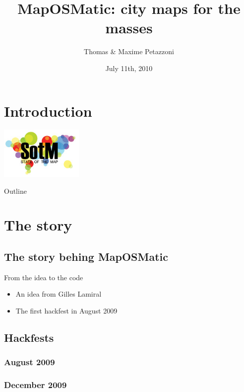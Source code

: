 \documentclass{beamer}
\title{MapOSMatic: city maps for the masses}
\author{Thomas \& Maxime {\sc Petazzoni}}
\institute{SOTM}
\date{July 11th, 2010}
\begin{document}
\section{Introduction}
\begin{frame}[t,plain]
  \titlepage

  \begin{center}
  \includegraphics[height=2.5cm]{sotm.jpg}
  \end{center}
\end{frame}

\begin{frame}[t]{Outline}
  \setcounter{tocdepth}{1}
  \tableofcontents
\end{frame}

\section{The story}

\subsection{The story behing MapOSMatic}
\begin{frame}[t]{From the idea to the code}
  \begin{itemize}
    \item<1-> An idea from Gilles Lamiral
    \item<2-> The first hackfest in August 2009
  \end{itemize}
\end{frame}

\subsection{Hackfests}
\subsubsection{August 2009}
\subsubsection{December 2009}
\end{document}
